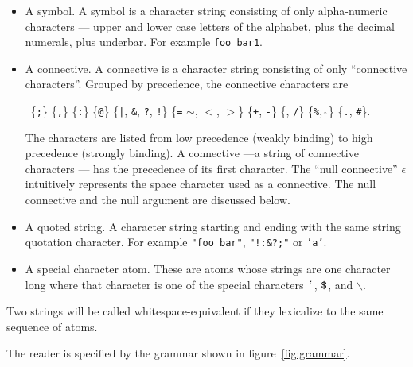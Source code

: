 \documentclass{article}
\newcommand{\mtt}[1]{\mbox{\tt #1}}
\begin{document}
\begin{itemize}
\item A symbol.  A symbol is a character string consisting of only alpha-numeric characters --- upper and lower case letters of the alphabet, plus the decimal numerals, plus underbar.
  For example {\tt foo\_bar1}.
\item A connective.  A connective is a character string consisting of only ``connective characters''.
  Grouped by precedence, the connective characters are
  
  \medskip
  \centerline{~\;\;\;\;\;\;\{\mtt{;}\} \{\mtt{,}\} \{\mtt{:}\} \{\mtt{@}\}
  \{{\tt |}, {\tt \&}, {\tt ?}, {\tt !}\} \{{\tt =} {\tt $\sim$}, {\tt $<$}, {\tt $>$}\} \{{\tt +}, {\tt -}\}
  \{{\tt *}, {\tt /}\} \{{\tt \%}, $\hat{~}$\} \{{\tt .}, {\tt \#}\}.}
  
  \medskip
  The characters are listed from low precedence (weakly binding) to high precedence (strongly binding). A connective
  ---a string of connective characters --- has the precedence of its first character.  The ``null connective'' $\epsilon$
  intuitively represents the space character used as a connective.  The null connective and the null argument are discussed below.
\item A quoted string.  A character string starting and ending with the same string quotation character.  For example {\tt "foo bar"}, {\tt "!:\&?;"} or {\tt 'a'}.
\item A special character atom. These are atoms whose strings are one character long where that character is one of
  the special characters $\mtt{`}$, $\mtt{\$}$, and $\backslash$.
\end{itemize}

Two strings will be called whitespace-equivalent if they lexicalize to the same sequence of atoms.

\newcommand{\sym}{\mathrm{SYM}}
\newcommand{\conn}{\mathrm{CONN}}
\newcommand{\quot}{\mathrm{QUOTE}}
\newcommand{\misc}{\mathrm{MISC}}
\newcommand{\app}{\mathrm{APP}}
\newcommand{\var}{\mathrm{VAR}}


The reader is specified by the grammar shown in figure~\ref{fig:grammar}.
\end{document}

